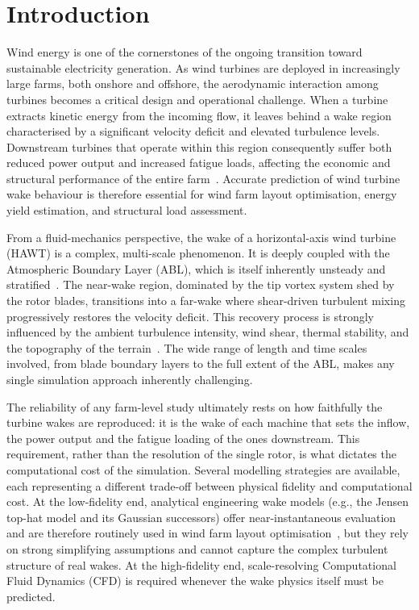 \section{Introduction}
\label{introduction}
Wind energy is one of the cornerstones of the ongoing transition toward sustainable electricity generation. As wind turbines are deployed in increasingly large farms, both onshore and offshore, the aerodynamic interaction among turbines becomes a critical design and operational challenge. When a turbine extracts kinetic energy from the incoming flow, it leaves behind a wake region characterised by a significant velocity deficit and elevated turbulence levels. Downstream turbines that operate within this region consequently suffer both reduced power output and increased fatigue loads, affecting the economic and structural performance of the entire farm~\cite{Porte-Agel2020}. Accurate prediction of wind turbine wake behaviour is therefore essential for wind farm layout optimisation, energy yield estimation, and structural load assessment.

From a fluid-mechanics perspective, the wake of a horizontal-axis wind turbine (HAWT) is a complex, multi-scale phenomenon. It is deeply coupled with the Atmospheric Boundary Layer (ABL), which is itself inherently unsteady and stratified~\cite{Porte-Agel2020}. The near-wake region, dominated by the tip vortex system shed by the rotor blades, transitions into a far-wake where shear-driven turbulent mixing progressively restores the velocity deficit. This recovery process is strongly influenced by the ambient turbulence intensity, wind shear, thermal stability, and the topography of the terrain~\cite{heck2025unravelingeffectsatmosphericdynamics}. The wide range of length and time scales involved, from blade boundary layers to the full extent of the ABL, makes any single simulation approach inherently challenging.

The reliability of any farm-level study ultimately rests on how faithfully the turbine wakes are reproduced: it is the wake of each machine that sets the inflow, the power output and the fatigue loading of the ones downstream. This requirement, rather than the resolution of the single rotor, is what dictates the computational cost of the simulation. Several modelling strategies are available, each representing a different trade-off between physical fidelity and computational cost. At the low-fidelity end, analytical engineering wake models (e.g., the Jensen top-hat model and its Gaussian successors) offer near-instantaneous evaluation and are therefore routinely used in wind farm layout optimisation~\cite{GholamiAnjiraki2025}, but they rely on strong simplifying assumptions and cannot capture the complex turbulent structure of real wakes. At the high-fidelity end, scale-resolving Computational Fluid Dynamics (CFD) is required whenever the wake physics itself must be predicted.

